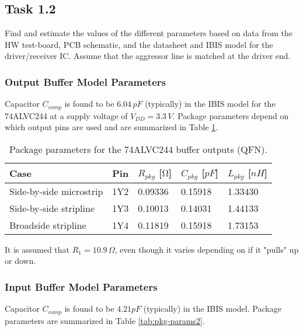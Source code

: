 \documentclass[../main.tex]{subfiles}
\begin{document}

\newpage

\subsection{Task 1.2}

Find and estimate the values of the different parameters based on data from the HW test-board, PCB schematic, and the datasheet and IBIS model for the driver/receiver IC. Assume that the aggressor line is matched at the driver end.

\solution

\subsubsection{Output Buffer Model Parameters}

Capacitor $C_{comp}$ is found to be $6.04\,\si{pF}$ (typically) in the IBIS model for the 74ALVC244 at a supply voltage of $V_{DD} = 3.3\,\si{V}$. Package parameters depend on which output pins are used and are summarized in Table \ref{tab:pkg-params}.

\begin{table}[h]
    \centering
    \begin{tabular}{l|l l l l}
        \toprule[1pt]
        \textbf{Case} & \textbf{Pin} & $R_{pkg}$ [$\si{\ohm}$] & $C_{pkg}$ [$\si{pF}$] & $L_{pkg}$ [$\si{nH}$] \\
        \midrule
        Side-by-side microstrip & 1Y2 & 0.09336 & 0.15918 & 1.33430 \\
        Side-by-side stripline  & 1Y3 & 0.10013 & 0.14031 & 1.44133 \\
        Broadside stripline     & 1Y4 & 0.11819 & 0.15918 & 1.73153 \\
        \bottomrule[1pt]
    \end{tabular}
    \caption{Package parameters for the 74ALVC244 buffer outputs (QFN).}
    \label{tab:pkg-params}
\end{table}

It is assumed that $R_1 = 10.9\,\si{\Omega}$, even though it varies depending on if it "pulls" up or down.

\subsubsection{Input Buffer Model Parameters}

Capacitor $C_{comp}$ is found to be $4.21\si{pF}$ (typically) in the IBIS model. Package parameters are summarized in Table \ref{tab:pkg-params2}.
\end{document}
